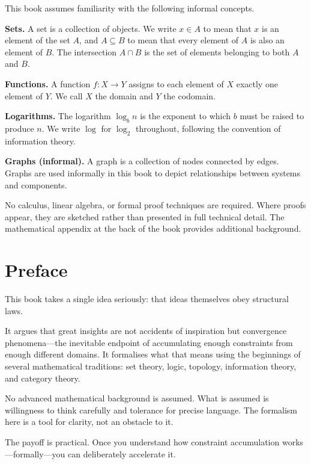 \documentclass[11pt]{book}
\theoremstyle{plain}
\theoremstyle{definition}
\theoremstyle{remark}
\begin{document}
This book assumes familiarity with the following informal concepts.

\textbf{Sets.} A set is a collection of objects. We write $x \in A$ to
mean that $x$ is an element of the set $A$, and $A \subseteq B$ to mean
that every element of $A$ is also an element of $B$. The intersection
$A \cap B$ is the set of elements belonging to both $A$ and $B$.

\textbf{Functions.} A function $f : X \to Y$ assigns to each element of
$X$ exactly one element of $Y$. We call $X$ the domain and $Y$ the
codomain.

\textbf{Logarithms.} The logarithm $\log_b n$ is the exponent to which
$b$ must be raised to produce $n$. We write $\log$ for $\log_2$
throughout, following the convention of information theory.

\textbf{Graphs (informal).} A graph is a collection of nodes connected
by edges. Graphs are used informally in this book to depict
relationships between systems and components.

No calculus, linear algebra, or formal proof techniques are required.
Where proofs appear, they are sketched rather than presented in full
technical detail. The mathematical appendix at the back of the book
provides additional background.

\chapter*{Preface}

This book takes a single idea seriously: that ideas themselves obey
structural laws.

It argues that great insights are not accidents of inspiration but
convergence phenomena---the inevitable endpoint of accumulating enough
constraints from enough different domains. It formalises what that means
using the beginnings of several mathematical traditions: set theory,
logic, topology, information theory, and category theory.

No advanced mathematical background is assumed. What is assumed is
willingness to think carefully and tolerance for precise language. The
formalism here is a tool for clarity, not an obstacle to it.

The payoff is practical. Once you understand how constraint accumulation
works---formally---you can deliberately accelerate it.
\end{document}
